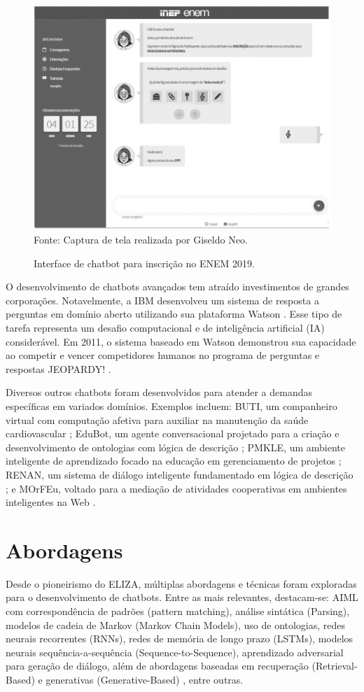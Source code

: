 \documentclass[a4paper,oneside]{book}
\begin{document}
\begin{figure}
	\centering
	\caption{Interface de chatbot para inscrição no ENEM 2019.}
	\includegraphics[width=0.5\linewidth]{fig/enem.png}
	\label{fig:enem}
	{\footnotesize Fonte: Captura de tela realizada por Giseldo Neo.}
\end{figure}

O desenvolvimento de chatbots avançados tem atraído investimentos de grandes corporações. Notavelmente, a IBM desenvolveu um sistema de resposta a perguntas em domínio aberto utilizando sua plataforma Watson \cite{Ferrucci2012}. Esse tipo de tarefa representa um desafio computacional e de inteligência artificial (IA) considerável. Em 2011, o sistema baseado em Watson demonstrou sua capacidade ao competir e vencer competidores humanos no programa de perguntas e respostas JEOPARDY! \cite{Ferrucci2012}.

Diversos outros chatbots foram desenvolvidos para atender a demandas específicas em variados domínios. Exemplos incluem: BUTI, um companheiro virtual com computação afetiva para auxiliar na manutenção da saúde cardiovascular \cite{Junior2008}; EduBot, um agente conversacional projetado para a criação e desenvolvimento de ontologias com lógica de descrição \cite{Lima2017}; PMKLE, um ambiente inteligente de aprendizado focado na educação em gerenciamento de projetos \cite{Torreao2005}; RENAN, um sistema de diálogo inteligente fundamentado em lógica de descrição \cite{AZEVEDO2015}; e MOrFEu, voltado para a mediação de atividades cooperativas em ambientes inteligentes na Web \cite{Bada2012}.

\section{Abordagens}

Desde o pioneirismo do ELIZA, múltiplas abordagens e técnicas foram exploradas para o desenvolvimento de chatbots. Entre as mais relevantes, destacam-se: AIML com correspondência de padrões (pattern matching), análise sintática (Parsing), modelos de cadeia de Markov (Markov Chain Models), uso de ontologias, redes neurais recorrentes (RNNs), redes de memória de longo prazo (LSTMs), modelos neurais sequência-a-sequência (Sequence-to-Sequence), aprendizado adversarial para geração de diálogo, além de abordagens baseadas em recuperação (Retrieval-Based) e generativas (Generative-Based) \cite{Borah2019, Ramesh2019, Shaikh2016, Abdul-Kader2015, Li2018}, entre outras.
\end{document}
